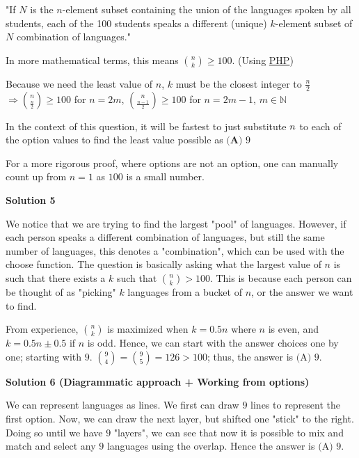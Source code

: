 \begin{enumerate}
 "If $N$ is the $n$-element subset containing the union of the languages spoken by all students, each of the 100 students speaks a different (unique) $k$-element subset of $N$ combination of languages."

 In more mathematical terms, this means ${n \choose k} \ge 100$. (Using \href{https://artofproblemsolving.com/wiki/index.php?title=Pigeonhole\_Principle}{PHP})

 Because we need the least value of $n$, $k$ must be the closest integer to $\frac{n}{2}$
$\Rightarrow {n \choose \frac{n}{2}} \ge 100$ for $n = 2m$, ${n \choose \frac{n-1}{2}} \ge 100$ for $n=2m-1$, $m \in \mathbb{N}$

 In the context of this question, it will be fastest to just substitute $\normalsize n$ to each of the option values to find the least value possible as $\boxed{\textbf{(A) } 9}$

 For a more rigorous proof, where options are not an option, one can manually count up from $n=1$ as $100$ is a small number. 

 



\textbf{Solution 5}

We notice that we are trying to find the largest "pool" of languages. However, if each person speaks a different combination of languages, but still the same number of languages, this denotes a "combination", which can be used with the choose function. The question is basically asking what the largest value of $n$ is such that there exists a $k$ such that $\binom{n}{k} > 100$. This is because each person can be thought of as "picking" $k$ languages from a bucket of $n$, or the answer we want to find.

 From experience, $\binom{n}{k}$ is maximized when $k = 0.5n$ where $n$ is even, and $k = 0.5n \pm 0.5$ if $n$ is odd. Hence, we can start with the answer choices one by one; starting with $9$. $\binom{9}{4}=\binom{9}{5}=126>100$; thus, the answer is $\boxed{\text{(A) 9}}$.

 



\textbf{Solution 6 (Diagrammatic approach + Working from options)}

We can represent languages as lines. We first can draw $9$ lines to represent the first option. Now, we can draw the next layer, but shifted one "stick" to the right. Doing so until we have $9$ "layers", we can see that now it is possible to mix and match and select any $9$ languages using the overlap. Hence the answer is $\boxed{\text{(A) 9}}$.


\end{enumerate}
